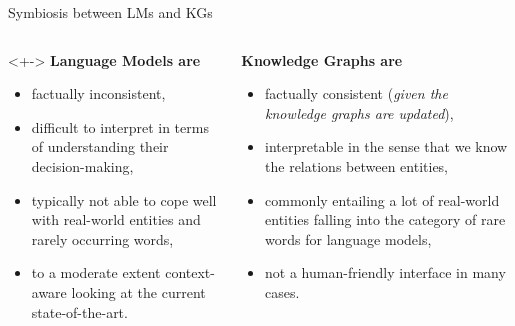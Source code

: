 \begin{frame}{Symbiosis between LMs and KGs}
\begin{columns}
\begin{column}[T]{0.5\textwidth}<+->
\textbf{Language Models are}
    \begin{itemize}
        \item factually inconsistent,
        \item difficult to interpret in terms of understanding their decision-making,
        \item typically not able to cope well with real-world entities and rarely occurring words,
        \item to a moderate extent context-aware looking at the current state-of-the-art.
    \end{itemize}
\end{column}
\begin{column}[T]{0.5\textwidth}\onslide<+->
\textbf{Knowledge Graphs are}
    \begin{itemize}
        \item factually consistent (\textit{given the knowledge graphs are updated}),
        \item interpretable in the sense that we know the relations between entities,
        \item commonly entailing a lot of real-world entities falling into the category of rare words for language models,
        \item not a human-friendly interface in many cases.
    \end{itemize}
\end{column}
\end{columns}
\vspace{5pt}
\end{frame}

